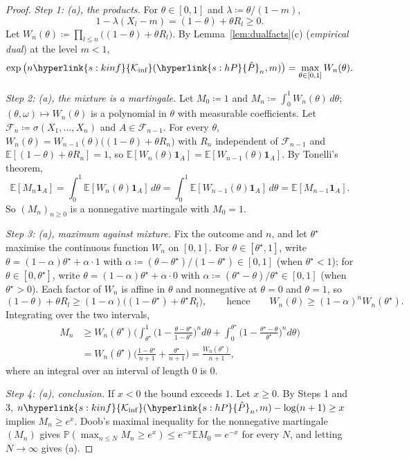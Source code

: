 \documentclass[11pt]{article}
\newcommand{\E}{\mathbb{E}}
\newcommand{\Prob}{\mathbb{P}}
\newcommand{\ind}{\mathbf{1}}
\newcommand{\sy}[2]{{\hyperlink{#1}{#2}}}
\newcommand{\Kinf}{\sy{s:kinf}{\mathcal{K}_{\inf}}}
\newcommand{\hP}{\sy{s:hP}{\hat{P}}}
\begin{document}
\begin{proof}
\emph{Step 1: (a), the products.} For $\theta\in[0,1]$ and $\lambda\coloneqq\theta/(1-m)$,
\[
  1-\lambda(X_l-m)=(1-\theta)+\theta R_l\ge0 .
\]
Let $W_n(\theta)\coloneqq\prod_{l\le n}\big((1-\theta)+\theta R_l\big)$. By
Lemma~\ref{lem:dualfacts}(c) (\emph{empirical dual}) at the level $m<1$,
\[
  \exp\big(n\Kinf(\hP_n,m)\big)=\max_{\theta\in[0,1]}W_n(\theta).
\]

\emph{Step 2: (a), the mixture is a martingale.} Let $M_0\coloneqq1$ and
$M_n\coloneqq\int_0^1W_n(\theta)\,d\theta$; $(\theta,\omega)\mapsto W_n(\theta)$ is a polynomial in
$\theta$ with measurable coefficients. Let $\mathcal F_n\coloneqq\sigma(X_1,\dots,X_n)$ and
$A\in\mathcal F_{n-1}$. For every $\theta$, $W_n(\theta)=W_{n-1}(\theta)\big((1-\theta)+\theta R_n\big)$
with $R_n$ independent of $\mathcal F_{n-1}$ and $\E[(1-\theta)+\theta R_n]=1$, so
$\E[W_n(\theta)\ind_A]=\E[W_{n-1}(\theta)\ind_A]$. By Tonelli's theorem,
\[
  \E[M_n\ind_A]=\int_0^1\E[W_n(\theta)\ind_A]\,d\theta=\int_0^1\E[W_{n-1}(\theta)\ind_A]\,d\theta=\E[M_{n-1}\ind_A].
\]
So $(M_n)_{n\ge0}$ is a nonnegative martingale with $M_0=1$.

\emph{Step 3: (a), maximum against mixture.} Fix the outcome and $n$, and let $\theta^\star$ maximise the
continuous function $W_n$ on $[0,1]$. For $\theta\in[\theta^\star,1]$, write
$\theta=(1-\alpha)\theta^\star+\alpha\cdot1$ with $\alpha\coloneqq(\theta-\theta^\star)/(1-\theta^\star)\in[0,1]$
(when $\theta^\star<1$); for $\theta\in[0,\theta^\star]$, write $\theta=(1-\alpha)\theta^\star+\alpha\cdot0$
with $\alpha\coloneqq(\theta^\star-\theta)/\theta^\star\in[0,1]$ (when $\theta^\star>0$). Each factor of
$W_n$ is affine in $\theta$ and nonnegative at $\theta=0$ and $\theta=1$, so
\[
  (1-\theta)+\theta R_l\ge(1-\alpha)\big((1-\theta^\star)+\theta^\star R_l\big),
  \qquad\text{hence}\qquad W_n(\theta)\ge(1-\alpha)^nW_n(\theta^\star).
\]
Integrating over the two intervals,
\begin{align*}
  M_n&\ge W_n(\theta^\star)\Big(\int_{\theta^\star}^1\Big(1-\frac{\theta-\theta^\star}{1-\theta^\star}\Big)^nd\theta
  +\int_0^{\theta^\star}\Big(1-\frac{\theta^\star-\theta}{\theta^\star}\Big)^nd\theta\Big)\\
  &=W_n(\theta^\star)\Big(\frac{1-\theta^\star}{n+1}+\frac{\theta^\star}{n+1}\Big)=\frac{W_n(\theta^\star)}{n+1},
\end{align*}
where an integral over an interval of length $0$ is $0$.

\emph{Step 4: (a), conclusion.} If $x<0$ the bound exceeds $1$. Let $x\ge0$. By Steps 1 and 3,
$n\Kinf(\hP_n,m)-\log(n+1)\ge x$ implies $M_n\ge e^x$. Doob's maximal inequality for the nonnegative
martingale $(M_n)$ gives $\Prob(\max_{n\le N}M_n\ge e^x)\le e^{-x}\E M_0=e^{-x}$ for every $N$, and
letting $N\to\infty$ gives (a).


\end{proof}
\end{document}
